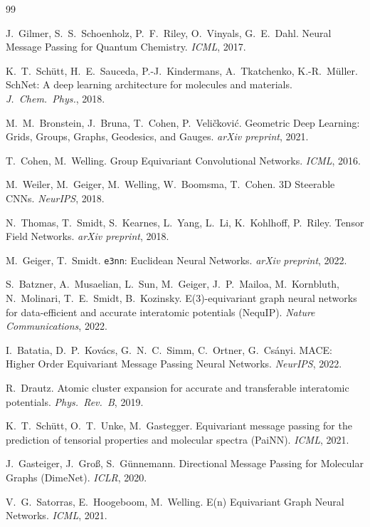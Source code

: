 \documentclass[pdflatex,sn-mathphys-num]{sn-jnl}%
\theoremstyle{thmstyleone}
\theoremstyle{thmstyletwo}
\theoremstyle{thmstylethree}
\begin{document}
\begin{thebibliography}{99}
\small

 J.~Gilmer, S.~S.~Schoenholz, P.~F.~Riley, O.~Vinyals, G.~E.~Dahl.
Neural Message Passing for Quantum Chemistry. \emph{ICML}, 2017.

 K.~T.~Sch\"utt, H.~E.~Sauceda, P.-J.~Kindermans, A.~Tkatchenko, K.-R.~M\"uller.
SchNet: A deep learning architecture for molecules and materials. \emph{J.\ Chem.\ Phys.}, 2018.

 M.~M.~Bronstein, J.~Bruna, T.~Cohen, P.~Veli\v{c}kovi\'c.
Geometric Deep Learning: Grids, Groups, Graphs, Geodesics, and Gauges. \emph{arXiv preprint}, 2021.

 T.~Cohen, M.~Welling. Group Equivariant Convolutional Networks. \emph{ICML}, 2016.

 M.~Weiler, M.~Geiger, M.~Welling, W.~Boomsma, T.~Cohen.
3D Steerable CNNs. \emph{NeurIPS}, 2018.

 N.~Thomas, T.~Smidt, S.~Kearnes, L.~Yang, L.~Li, K.~Kohlhoff, P.~Riley.
Tensor Field Networks. \emph{arXiv preprint}, 2018.

 M.~Geiger, T.~Smidt. \texttt{e3nn}: Euclidean Neural Networks. \emph{arXiv preprint}, 2022.

 S.~Batzner, A.~Musaelian, L.~Sun, M.~Geiger, J.~P.~Mailoa, M.~Kornbluth, N.~Molinari, T.~E.~Smidt, B.~Kozinsky.
E(3)-equivariant graph neural networks for data-efficient and accurate interatomic potentials (NequIP). \emph{Nature Communications}, 2022.

 I.~Batatia, D.~P.~Kov\'acs, G.~N.~C.~Simm, C.~Ortner, G.~Cs\'anyi.
MACE: Higher Order Equivariant Message Passing Neural Networks. \emph{NeurIPS}, 2022.

 R.~Drautz. Atomic cluster expansion for accurate and transferable interatomic potentials. \emph{Phys.\ Rev.\ B}, 2019.

 K.~T.~Sch\"utt, O.~T.~Unke, M.~Gastegger. Equivariant message passing for the prediction of tensorial properties and molecular spectra (PaiNN). \emph{ICML}, 2021.

 J.~Gasteiger, J.~Gro\ss, S.~G\"unnemann. Directional Message Passing for Molecular Graphs (DimeNet). \emph{ICLR}, 2020.

 V.~G.~Satorras, E.~Hoogeboom, M.~Welling. E(n) Equivariant Graph Neural Networks. \emph{ICML}, 2021.


\end{thebibliography}
\end{document}
